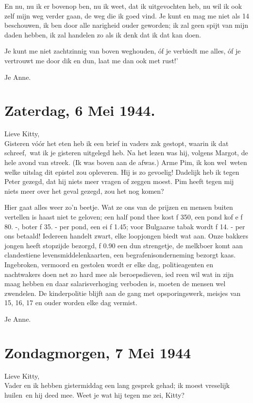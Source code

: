\documentclass{book}
\begin{document}
En nu, nu ik er bovenop ben, nu ik weet, dat ik uitgevochten heb, nu wil
ik ook zelf mijn weg verder gaan, de weg die ik goed vind. Je kunt en
mag me niet als 14 beschouwen, ik ben door alle narigheid ouder
geworden; ik zal geen spijt van mijn daden hebben, ik zal handelen zo
als ik denk dat ik dat kan doen.

Je kunt me niet zachtzinnig van boven weghouden, óf je verbiedt me
alles, óf je vertrouwt me door dik en dun, laat me dan ook met rust!'

Je Anne.

\chapter{Zaterdag, 6 Mei 1944.}

Lieve Kitty,\\Gisteren vóór het eten heb ik een brief in vaders zak
gestopt, waarin ik dat schreef,~wat ik je gisteren uitgelegd heb. Na het
lezen was hij, volgens Margot, de hele avond van streek. (Ik was boven
aan de afwas.) Arme Pim, ik kon wel~weten welke uitslag dit epistel zou
opleveren. Hij is zo gevoelig! Dadelijk heb ik tegen Peter gezegd, dat
hij niets meer vragen of zeggen moest. Pim heeft tegen mij niets meer
over het geval gezegd, zou het nog komen?

Hier gaat alles weer zo'n beetje. Wat ze ons van de prijzen en mensen
buiten vertellen is haast niet te geloven; een half pond thee kost ƒ
350, een pond kof e ƒ 80. -, boter ƒ 35. - per pond, een ei ƒ 1.45; voor
Bulgaarse tabak wordt ƒ 14. - per ons betaald! Iedereen handelt zwart,
elke loopjongen biedt wat aan. Onze bakkers jongen heeft stopzijde
bezorgd, ƒ 0.90 een dun strengetje, de melkboer komt aan clandestiene
levensmiddelenkaarten, een begrafenisonderneming bezorgt kaas.
Ingebroken, vermoord en gestolen wordt er elke dag, politieagenten en
nachtwakers doen net zo hard mee als beroepsdieven, ied reen wil wat in
zijn maag hebben en daar salarisverhoging verboden is, moeten de mensen
wel zwendelen. De kinderpolitie blijft aan de gang met opsporingswerk,
meisjes van 15, 16, 17 en ouder worden elke dag vermist.

Je Anne.

\chapter{Zondagmorgen, 7 Mei 1944}

Lieve Kitty,\\Vader en ik hebben gistermiddag een lang gesprek gehad; ik
moest vreselijk huilen~en hij deed mee. Weet je wat hij tegen me zei,
Kitty?
\end{document}
